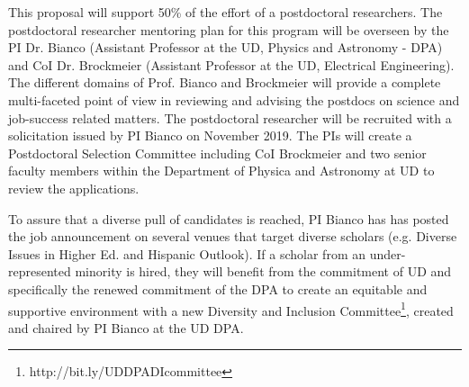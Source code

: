 This proposal will support 50\% of the effort of a postdoctoral researchers.  The postdoctoral researcher mentoring plan for this program will be overseen by the PI Dr. Bianco (Assistant Professor at the UD, Physics and Astronomy - DPA) and CoI Dr. Brockmeier (Assistant Professor at the UD, Electrical Engineering).  The different domains of Prof. Bianco and Brockmeier will provide a complete multi-faceted point of view in reviewing and advising the postdocs on science and job-success related matters. 
The postdoctoral researcher will be recruited with a solicitation issued by PI Bianco on November 2019.  The PIs will create a Postdoctoral Selection Committee including CoI Brockmeier and two senior faculty members within the Department of Physica and Astronomy at UD to review the applications.

To assure that a diverse pull of candidates is reached, PI Bianco has has posted the job announcement on several venues that target diverse scholars (e.g. Diverse Issues in Higher Ed. and Hispanic Outlook).  If a  scholar from an under-represented minority is hired, they will benefit from the commitment of UD and specifically the renewed commitment of the DPA to create an equitable and supportive environment with a new Diversity and Inclusion Committee\footnote{http://bit.ly/UDDPADIcommittee}, created and chaired by PI Bianco at the UD DPA.

